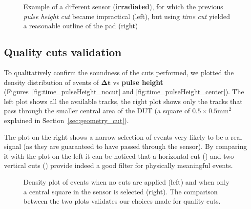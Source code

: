 \begin{figure}[ht]
    \centering
    \hfill
    \centering
    \captionsetup{width=\captionwidth}
    \caption{Example of a different sensor (\textbf{irradiated}), for which the previous \textit{pulse height cut} became impractical (left), but using \textit{time cut} yielded a reasonable outline of the pad (right)}
\end{figure}

\subsection{Quality cuts validation}

To qualitatively confirm the soundness of the cuts performed, we plotted the density distribution of events of \(\boldsymbol{\Delta t}\) vs \textbf{pulse height} (Figures~\ref{fig:time_pulseHeight_nocut} and \ref{fig:time_pulseHeight_center}). The left plot shows all the available tracks, the right plot shows only the tracks that pass through the smaller central area of the DUT (a square of \(0.5\times0.5\unit{\milli\meter^2}\) explained in Section~\ref{sec:geometry_cut}).

The plot on the right shows a narrow selection of events very likely to be a real signal (as they are guaranteed to have passed through the sensor). By comparing it with the plot on the left it can be noticed that a horizontal cut () and two vertical cuts () provide indeed a good filter for physically meaningful events. 


\begin{figure}[h!tbp]
    \centering
    \hfill
    \centering
    \captionsetup{width=\captionwidth}
        \caption{Density plot of events when no cuts are applied (left) and when only a central square in the sensor is selected (right). The comparison between the two plots validates our choices made for quality cuts.}
\end{figure}


